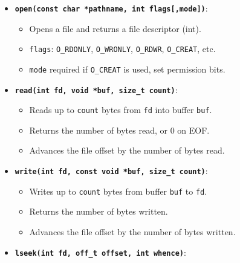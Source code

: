 \documentclass[8pt,twocolumn]{article}
\begin{document}
\begin{itemize}
  \setlength{\itemsep}{0pt} %
  \setlength{\parskip}{0pt}
  \item \textbf{\texttt{open(const char *pathname, int flags[,mode])}}:
\vspace{-0.6em}
    \begin{itemize}
      \setlength{\itemsep}{0pt} %
      \setlength{\parskip}{0pt}
      \item Opens a file and returns a file descriptor (int).
      \item \texttt{flags}: \texttt{O\_RDONLY}, \texttt{O\_WRONLY}, \texttt{O\_RDWR}, \texttt{O\_CREAT}, etc.
      \item \texttt{mode} required if \texttt{O\_CREAT} is used, set permission bits.
    \end{itemize}
\vspace{-0.6em}
  \item \textbf{\texttt{read(int fd, void *buf, size\_t count)}}:
\vspace{-0.6em}
    \begin{itemize}
      \setlength{\itemsep}{0pt} %
      \setlength{\parskip}{0pt}
      \item Reads up to \texttt{count} bytes from \texttt{fd} into buffer \texttt{buf}.
      \item Returns the number of bytes read, or 0 on EOF.
      \item Advances the file offset by the number of bytes read.
    \end{itemize}
\vspace{-0.6em}
  \item \textbf{\texttt{write(int fd, const void *buf, size\_t count)}}:
\vspace{-0.6em}
    \begin{itemize}
      \setlength{\itemsep}{0pt} %
      \setlength{\parskip}{0pt}
      \item Writes up to \texttt{count} bytes from buffer \texttt{buf} to \texttt{fd}.
      \item Returns the number of bytes written.
      \item Advances the file offset by the number of bytes written.
    \end{itemize}
\vspace{-0.6em}
  \item \textbf{\texttt{lseek(int fd, off\_t offset, int whence)}}:
\vspace{-0.6em}

\end{itemize}
\end{document}
